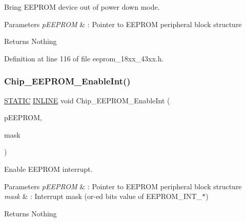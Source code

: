 Bring E\+E\+P\+R\+OM device out of power down mode. 


\begin{DoxyParams}{Parameters}
{\em p\+E\+E\+P\+R\+OM} & \+: Pointer to E\+E\+P\+R\+OM peripheral block structure \\
\hline
\end{DoxyParams}
\begin{DoxyReturn}{Returns}
Nothing 
\end{DoxyReturn}


Definition at line 116 of file eeprom\+\_\+18xx\+\_\+43xx.\+h.

\mbox{\label{group___e_e_p_r_o_m__18_x_x__43_x_x_gad2c0da142f469adc4467b4d230b5532b}} 
\subsubsection{\texorpdfstring{Chip\+\_\+\+E\+E\+P\+R\+O\+M\+\_\+\+Enable\+Int()}{Chip\_EEPROM\_EnableInt()}}
{\footnotesize\ttfamily \hyperlink{group___l_p_c___types___public___macros_ga10b2d890d871e1489bb02b7e70d9bdfb}{S\+T\+A\+T\+IC} \hyperlink{spifi__18xx__43xx_8h_a2eb6f9e0395b47b8d5e3eeae4fe0c116}{I\+N\+L\+I\+NE} void Chip\+\_\+\+E\+E\+P\+R\+O\+M\+\_\+\+Enable\+Int (\begin{DoxyParamCaption}\item[{\hyperlink{struct_l_p_c___e_e_p_r_o_m___t}{L\+P\+C\+\_\+\+E\+E\+P\+R\+O\+M\+\_\+T} $\ast$}]{p\+E\+E\+P\+R\+OM,  }\item[{uint32\+\_\+t}]{mask }\end{DoxyParamCaption})}



Enable E\+E\+P\+R\+OM interrupt. 


\begin{DoxyParams}{Parameters}
{\em p\+E\+E\+P\+R\+OM} & \+: Pointer to E\+E\+P\+R\+OM peripheral block structure \\
\hline
{\em mask} & \+: Interrupt mask (or-\/ed bits value of E\+E\+P\+R\+O\+M\+\_\+\+I\+N\+T\+\_\+$\ast$) \\
\hline
\end{DoxyParams}
\begin{DoxyReturn}{Returns}
Nothing 
\end{DoxyReturn}


